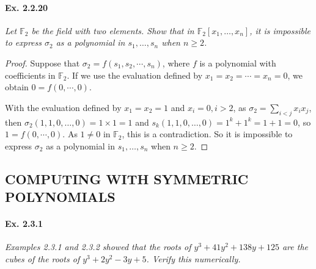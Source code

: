 \documentclass[11pt,a4paper]{article}
\newcommand{\F}{\mathbb{F}}
\begin{document}
\paragraph{Ex. 2.2.20}

{\it Let $\F_2$ be the field with two elements. Show that in $\F_2[x_1,\ldots,x_n]$, it is impossible to express $\sigma_2$ as a polynomial in $s_1,\ldots, s_n$ when $n\geq 2$.
}

\begin{proof}
Suppose that $\sigma_2 = f(s_1,s_2,\cdots,s_n)$, where $f$ is a polynomial with coefficients in $\mathbb{F}_2$.
If we use the evaluation defined by $x_1=x_2=\cdots = x_n =0$, we obtain $0 = f(0,\cdots,0)$.

With the evaluation defined by $x_1=x_2 = 1$ and $x_i = 0, i>2$, as $\sigma_2 = \sum_{i<j} x_i x_j$, then $\sigma_2(1,1,0,\ldots,0) = 1\times 1 = 1$ and $s_k(1,1,0,\ldots,0)  = 1^k + 1^k = 1+1 =  0$, so $1 = f(0,\cdots,0)$. As $1\neq 0$ in $\mathbb{F}_2$, this is a contradiction. So  it is impossible to express $\sigma_2$ as a polynomial in $s_1,\ldots, s_n$ when $n\geq 2$.
\end{proof}

\subsection{COMPUTING WITH SYMMETRIC POLYNOMIALS}
\paragraph{Ex. 2.3.1}

{\it Examples 2.3.1 and 2.3.2 showed that the roots of $y^3+41y^2+138y+125$ are the cubes of the roots of $y^3+2y^2-3y+5$. Verify this numerically.
}
\end{document}
